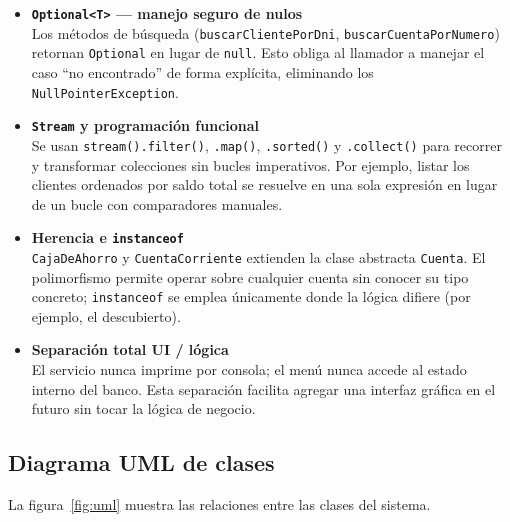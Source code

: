 \documentclass[12pt, a4paper]{article}
\begin{document}
\begin{itemize}[leftmargin=0.5cm]

  \item \textbf{\texttt{Optional<T>} — manejo seguro de nulos} \\
    Los métodos de búsqueda (\texttt{buscarClientePorDni},
    \texttt{buscarCuentaPorNumero}) retornan \texttt{Optional} en lugar de
    \texttt{null}. Esto obliga al llamador a manejar el caso ``no encontrado''
    de forma explícita, eliminando los \texttt{NullPointerException}.

  \item \textbf{\texttt{Stream} y programación funcional} \\
    Se usan \texttt{stream().filter()}, \texttt{.map()}, \texttt{.sorted()} y
    \texttt{.collect()} para recorrer y transformar colecciones sin bucles
    imperativos. Por ejemplo, listar los clientes ordenados por saldo total
    se resuelve en una sola expresión en lugar de un bucle con
    comparadores manuales.

  \item \textbf{Herencia e \texttt{instanceof}} \\
    \texttt{CajaDeAhorro} y \texttt{CuentaCorriente} extienden la clase
    abstracta \texttt{Cuenta}. El polimorfismo permite operar sobre cualquier
    cuenta sin conocer su tipo concreto; \texttt{instanceof} se emplea
    únicamente donde la lógica difiere (por ejemplo, el descubierto).

  \item \textbf{Separación total UI / lógica} \\
    El servicio nunca imprime por consola; el menú nunca accede al estado
    interno del banco. Esta separación facilita agregar una interfaz gráfica
    en el futuro sin tocar la lógica de negocio.

\end{itemize}

\newpage
\subsection{Diagrama UML de clases}

La figura~\ref{fig:uml} muestra las relaciones entre las clases del sistema.
\end{document}
